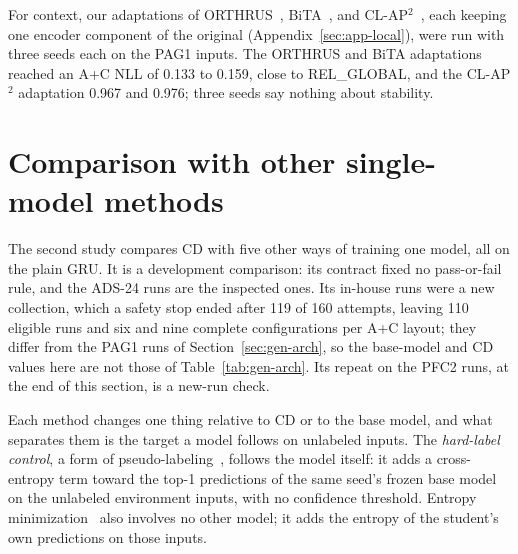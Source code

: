 For context, our adaptations of ORTHRUS~\cite{jiang2025orthrus},
BiTA~\cite{nayeri2026bita}, and CL-AP$^{2}$~\cite{liu2024clap2},
each keeping one encoder component of the original
(Appendix~\ref{sec:app-local}), were run with three seeds each on the
PAG1 inputs.
The ORTHRUS and BiTA adaptations reached an A+C NLL of 0.133 to 0.159,
close to REL\_GLOBAL, and the CL-AP$^{2}$ adaptation 0.967 and 0.976;
three seeds say nothing about stability.

\section{Comparison with other single-model methods}
\label{sec:gen-methods}

The second study compares CD with five other ways of training one
model, all on the plain GRU. It is a development comparison: its
contract fixed no pass-or-fail rule, and the ADS-24 runs are the
inspected ones. Its in-house runs were a new collection, which a safety
stop ended after 119 of 160 attempts, leaving 110 eligible runs and six
and nine complete configurations per A+C layout; they differ from the
PAG1 runs of Section~\ref{sec:gen-arch}, so the base-model and CD values
here are not those of Table~\ref{tab:gen-arch}. Its repeat on the PFC2
runs, at the end of this section, is a new-run check.

Each method changes one thing relative to CD or to the base model, and
what separates them is the target a model follows on unlabeled inputs.
The \emph{hard-label control}, a form of
pseudo-labeling~\cite{lee2013pseudo}, follows the model itself: it adds
a cross-entropy term toward the top-1 predictions of the same seed's
frozen base model on the unlabeled environment inputs, with no
confidence threshold. Entropy minimization~\cite{grandvalet2004semi}
also involves no other model; it adds the entropy of the student's own
predictions on those inputs.

